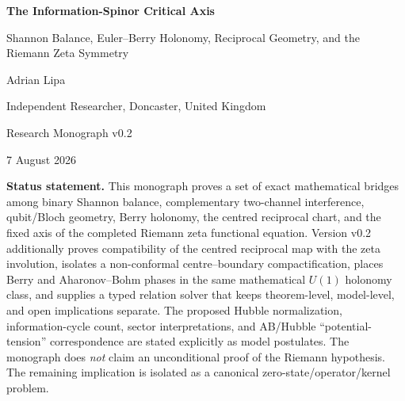 \documentclass[11pt,oneside]{book}
\theoremstyle{remark}
\begin{document}
\frontmatter
\begin{titlepage}
\centering
\vspace*{2.0cm}
{\Huge\bfseries The Information-Spinor Critical Axis\par}
\vspace{0.5cm}
{\Large Shannon Balance, Euler--Berry Holonomy, Reciprocal Geometry, and the Riemann Zeta Symmetry\par}
\vspace{1.5cm}
{\Large Adrian Lipa\par}
\vspace{0.3cm}
{\large Independent Researcher, Doncaster, United Kingdom\par}
\vfill
{\large Research Monograph v0.2\par}
{\large 7 August 2026\par}
\vspace{1cm}
\begin{minipage}{0.88\textwidth}
\small
\textbf{Status statement.} This monograph proves a set of exact mathematical bridges among binary Shannon balance, complementary two-channel interference, qubit/Bloch geometry, Berry holonomy, the centred reciprocal chart, and the fixed axis of the completed Riemann zeta functional equation. Version v0.2 additionally proves compatibility of the centred reciprocal map with the zeta involution, isolates a non-conformal centre--boundary compactification, places Berry and Aharonov--Bohm phases in the same mathematical $U(1)$ holonomy class, and supplies a typed relation solver that keeps theorem-level, model-level, and open implications separate. The proposed Hubble normalization, information-cycle count, sector interpretations, and AB/Hubble ``potential-tension'' correspondence are stated explicitly as model postulates. The monograph does \emph{not} claim an unconditional proof of the Riemann hypothesis. The remaining implication is isolated as a canonical zero-state/operator/kernel problem.
\end{minipage}
\end{titlepage}
\end{document}
